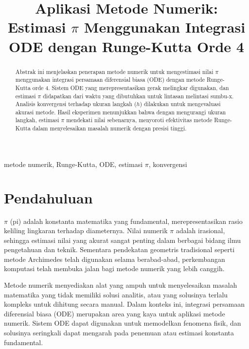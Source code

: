 \documentclass[conference]{IEEEtran}
\title{Aplikasi Metode Numerik: Estimasi $\pi$ Menggunakan Integrasi ODE dengan Runge-Kutta Orde 4}
\author{\IEEEauthorblockN{Ganendra Garda Pratama}
\IEEEauthorblockA{\textit{Departemen Teknik Elektro
Universitas Indonesia} \\
\textit{Depok, Indonesia} \\
ganendra.garda@office.ui.ac.id}
}
\begin{document}
\maketitle

\maketitle

\begin{abstract}
Abstrak ini menjelaskan penerapan metode numerik untuk mengestimasi nilai $\pi$ menggunakan integrasi persamaan diferensial biasa (ODE) dengan metode Runge-Kutta orde 4. Sistem ODE yang merepresentasikan gerak melingkar digunakan, dan estimasi $\pi$ didapatkan dari waktu yang dibutuhkan untuk lintasan melintasi sumbu-x. Analisis konvergensi terhadap ukuran langkah ($h$) dilakukan untuk mengevaluasi akurasi metode. Hasil eksperimen menunjukkan bahwa dengan mengurangi ukuran langkah, estimasi $\pi$ mendekati nilai sebenarnya, menyoroti efektivitas metode Runge-Kutta dalam menyelesaikan masalah numerik dengan presisi tinggi.
\end{abstract}

\begin{IEEEkeywords}
metode numerik, Runge-Kutta, ODE, estimasi $\pi$, konvergensi
\end{IEEEkeywords}

\section{Pendahuluan}
$\pi$ (pi) adalah konstanta matematika yang fundamental, merepresentasikan rasio keliling lingkaran terhadap diameternya. Nilai numerik $\pi$ adalah irasional, sehingga estimasi nilai yang akurat sangat penting dalam berbagai bidang ilmu pengetahuan dan teknik. Sementara pendekatan geometris tradisional seperti metode Archimedes telah digunakan selama berabad-abad, perkembangan komputasi telah membuka jalan bagi metode numerik yang lebih canggih.

Metode numerik menyediakan alat yang ampuh untuk menyelesaikan masalah matematika yang tidak memiliki solusi analitis, atau yang solusinya terlalu kompleks untuk dihitung secara manual. Dalam konteks ini, integrasi persamaan diferensial biasa (ODE) merupakan area yang kaya untuk aplikasi metode numerik. Sistem ODE dapat digunakan untuk memodelkan fenomena fisik, dan solusinya seringkali dapat mengarah pada penemuan atau estimasi konstanta fundamental.
\end{document}

